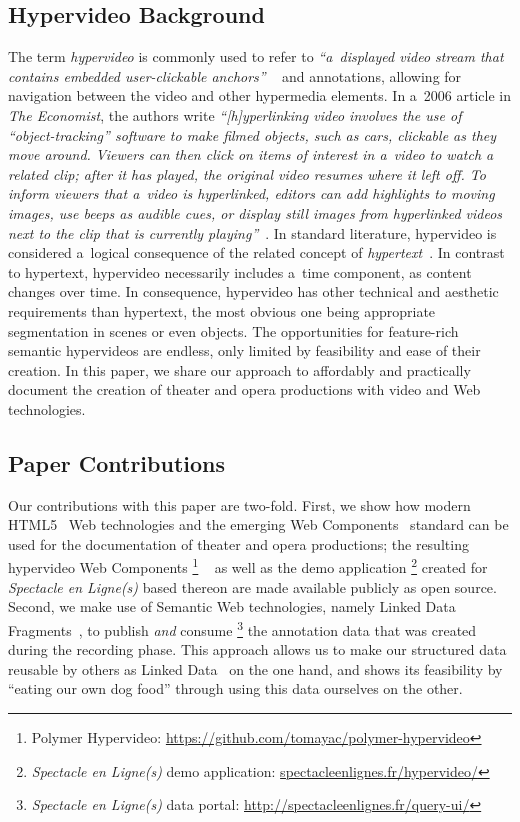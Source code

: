 \documentclass[runningheads,a4paper]{llncs}
\begin{document}
\subsection{Hypervideo Background}

The term \emph{hypervideo} is commonly used to refer to
\textit{``a~displayed video stream that contains embedded user-clickable anchors''}%
~\cite{sawhney1996hypercafe,smith2002extensible}
and annotations, allowing for navigation between the video and other hypermedia elements.
In a~2006 article in \emph{The Economist}, the authors write 
\textit{``[h]yperlinking video involves the use of ``object-tracking'' software
to make filmed objects, such as cars, clickable as they move around.
Viewers can then click on items of interest in a~video
to watch a related clip; after it has played,
the original video resumes where it left off.
To inform viewers that a~video is hyperlinked,
editors can add highlights to moving images, use beeps as audible cues,
or display still images from hyperlinked videos
next to the clip that is currently playing''}~\cite{economist2006hypervideo}.
In standard literature, hypervideo is considered a~logical consequence
of the related concept of \emph{hypertext}~\cite{bernerslee1990hypertext}.
In contrast to hypertext, hypervideo necessarily includes a~time component,
as content changes over time.
In consequence, hypervideo has other technical and aesthetic requirements
than hypertext, the most obvious one being appropriate segmentation in scenes
or even objects.
The opportunities for feature-rich semantic hypervideos are endless,
only limited by feasibility and ease of their creation.
In this paper, we share our approach to affordably and practically document
the creation of theater and opera productions with video and Web technologies.

\subsection{Paper Contributions}

Our contributions with this paper are two-fold.
First, we show how modern HTML5~\cite{berjon2012html5} Web technologies
and the emerging Web Components~\cite{cooney2013webcomponents} standard
can be used for the documentation of theater and opera productions;
the resulting hypervideo Web Components%
\footnote{Polymer Hypervideo: \url{https://github.com/tomayac/polymer-hypervideo}}%
~\cite{steiner2014hypervideo} as well as the demo application%
\footnote{\emph{Spectacle en Ligne(s)} demo application: \url{spectacleenlignes.fr/hypervideo/}}
created for \emph{Spectacle en Ligne(s)} based thereon
are made available publicly as open source.
Second, we make use of Semantic Web technologies, namely Linked Data Fragments~\cite{verborgh2014ldf},
to publish \emph{and} consume%
\footnote{\emph{Spectacle en Ligne(s)} data portal: \url{http://spectacleenlignes.fr/query-ui/}}
the annotation data that was created during the recording phase.
This approach allows us to make our structured data reusable
by others as Linked Data~\cite{bernerslee2006linkeddata} on the one hand,
and shows its feasibility by ``eating our own dog food'' through using this data ourselves on the other.
\end{document}
